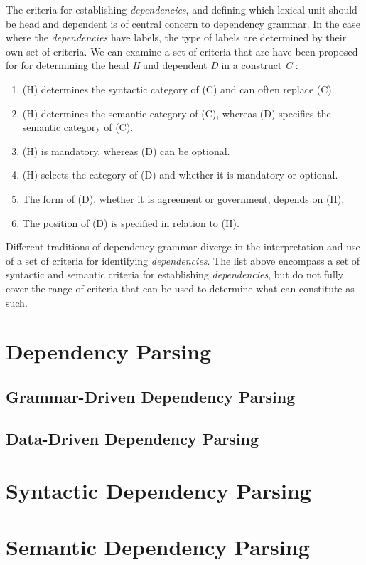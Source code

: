 The criteria for establishing \textit{dependencies}, and defining which lexical unit should be head and dependent is of central concern to dependency grammar. In the case where the \textit{dependencies} have labels, the type of labels are determined by their own set of criteria. We can examine a set of criteria that are have been proposed for for determining the head \textit{H} and dependent \textit{D} in a construct \textit{C} \cite{Zwicky:85, Hudson:90, Niv:05}:

\begin{enumerate}
\item (H) determines the syntactic category of (C) and can often replace (C).
\item (H) determines the semantic category of (C), whereas (D) specifies the semantic category of (C).
\item (H) is mandatory, whereas (D) can be optional.
\item (H) selects the category of (D) and whether it is mandatory or optional.
\item The form of (D), whether it is agreement or government, depends on (H).
\item The position of (D) is specified in relation to (H).
\end{enumerate}

Different traditions of dependency grammar diverge in the interpretation and use of a set of criteria for identifying \textit{dependencies}. The list above encompass a set of syntactic and semantic criteria for establishing \textit{dependencies}, but do not fully cover the range of criteria that can be used to determine what can constitute as such.


\section{Dependency Parsing}
\subsection{Grammar-Driven Dependency Parsing}
\subsection{Data-Driven Dependency Parsing}


\section{Syntactic Dependency Parsing}


\section{Semantic Dependency Parsing}





